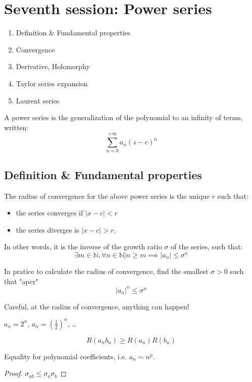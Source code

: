 \section{Seventh session: Power series}
\begin{enumerate}
    \item Definition \& Fundamental properties
    \item Convergence
    \item Derivative, Holomorphy
    \item Taylor series expansion
    \item Laurent series
\end{enumerate}

A power series is the generalization of the polynomial to an infinity of terms, written:
$$\sum_{n=0}^{+\infty}a_n(z-c)^n$$

\subsection{Definition \& Fundamental properties}

\begin{defi}
    The radius of convergence for the above power series is the unique $r$ such that:
    \begin{itemize}
        \item the series converges if $|x - c| < r$ 
        \item the series diverges is $|x - c| > r$.
    \end{itemize}

    In other words, it is the inverse of the growth ratio $\sigma$ of the series, such that:
    $$\exists m \in \mathbb{N}, \forall n \in \mathbb{N} \vert n \geq m \implies |a_n| \leq \sigma^n $$
\end{defi}

In pratice to calculate the radius of convergence, find the smallest $\sigma > 0$ such that "apcr" $$|a_n|^n \leq \sigma^n$$

\begin{note}
    Careful, at the radius of convergence, anything can happen!
\end{note}

\begin{example}
    [$\star$]
    $a_n = 2^n$, $a_n = \left(\frac{1}{2}\right)^n$, \dots
\end{example}

\begin{thm*}
    $$R(a_nb_n) \geq R(a_n)R(b_n)$$

    Equality for polynomial coefficients, i.e. $a_n \sim n^p$.
\end{thm*}
\begin{proof}
    $\sigma_{ab} \leq \sigma_a\sigma_b$
\end{proof}

